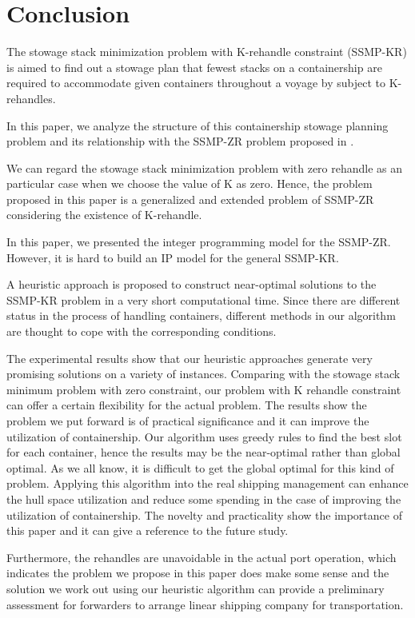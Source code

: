 \documentclass[review,3p,times,authoryear,12pt]{elsarticle}
\begin{document}
\section{Conclusion}
\label{sec:con}
The stowage stack minimization problem with K-rehandle constraint (SSMP-KR) is aimed to find out a stowage plan that fewest stacks on a containership are required to accommodate given containers throughout a voyage by subject to K-rehandles.

In this paper, we analyze the structure of this containership stowage planning problem and its relationship with the SSMP-ZR problem proposed in \cite{wang2014stowage}.

We can regard the stowage stack minimization problem with zero rehandle as an particular case when we choose the value of K as zero.
Hence, the problem proposed in this paper is a generalized and extended problem of SSMP-ZR considering the existence of K-rehandle.


In this paper, we presented the integer programming model for the SSMP-ZR.
However, it is hard to build an IP model for the general SSMP-KR.

A heuristic approach is proposed to construct near-optimal solutions to the SSMP-KR problem in a very short computational time.
Since there are different status in the process of handling containers, different methods in our algorithm are thought to cope with the corresponding conditions.

The experimental results show that our heuristic approaches generate very promising solutions on a variety of instances.
Comparing with the stowage stack minimum problem with zero constraint, our problem with K rehandle constraint can offer a certain flexibility for the actual problem.
The results show the problem we put forward is of practical significance and it can improve the utilization of containership.
Our algorithm uses greedy rules to find the best slot for each container, hence the results may be the near-optimal rather than global optimal.
As we all know, it is difficult to get the global optimal for this kind of problem.
Applying this algorithm into the real shipping management can enhance the hull space utilization and reduce some spending in the case of improving the utilization of containership.
The novelty and practicality show the importance of this paper and it can give a reference to the future study.


Furthermore, the rehandles are unavoidable in the actual port operation, which indicates the problem we propose in this paper does make some
sense and the solution we work out using our heuristic algorithm can provide a preliminary assessment for forwarders to arrange
linear shipping company for transportation.




\end{document}
